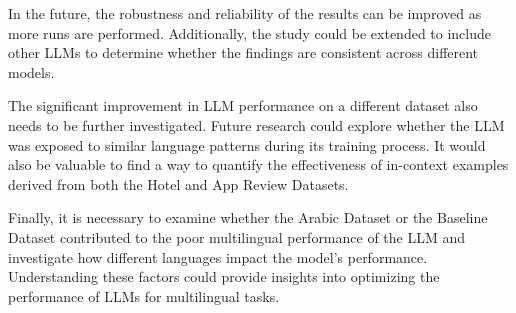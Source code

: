 \documentclass[sigconf, nonacm]{acmart}
\theoremstyle{definition}
\begin{document}
In the future, the robustness and reliability of the results can be improved as more runs are performed. Additionally, the study could be extended to include other LLMs to determine whether the findings are consistent across different models.

The significant improvement in LLM performance on a different dataset also needs to be further investigated. Future research could explore whether the LLM was exposed to similar language patterns during its training process. It would also be valuable to find a way to quantify the effectiveness of in-context examples derived from both the Hotel and App Review Datasets.

Finally, it is necessary to examine whether the Arabic Dataset or the Baseline Dataset contributed to the poor multilingual performance of the LLM and investigate how different languages impact the model's performance. Understanding these factors could provide insights into optimizing the performance of LLMs for multilingual tasks.



\end{document}
